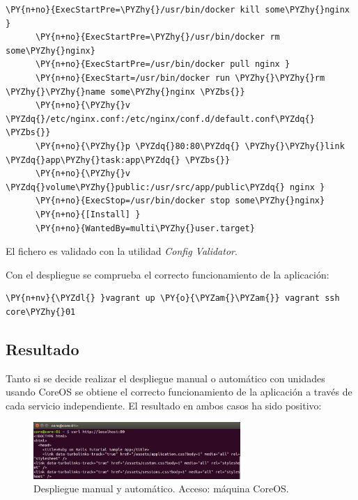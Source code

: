\begin{codelisting}
\begin{Verbatim}[fontsize=\relsize{-2.5},fontseries=b,commandchars=\\\{\}]
      \PY{n+no}{ExecStartPre=\PYZhy{}/usr/bin/docker kill some\PYZhy{}nginx }
      \PY{n+no}{ExecStartPre=\PYZhy{}/usr/bin/docker rm some\PYZhy{}nginx}
      \PY{n+no}{ExecStartPre=/usr/bin/docker pull nginx }
      \PY{n+no}{ExecStart=/usr/bin/docker run \PYZhy{}\PYZhy{}rm \PYZhy{}\PYZhy{}name some\PYZhy{}nginx \PYZbs{}}
      \PY{n+no}{\PYZhy{}v \PYZdq{}/etc/nginx.conf:/etc/nginx/conf.d/default.conf\PYZdq{} \PYZbs{}}
      \PY{n+no}{\PYZhy{}p \PYZdq{}80:80\PYZdq{} \PYZhy{}\PYZhy{}link \PYZdq{}app\PYZhy{}task:app\PYZdq{} \PYZbs{}}
      \PY{n+no}{\PYZhy{}v \PYZdq{}volume\PYZhy{}public:/usr/src/app/public\PYZdq{} nginx }
      \PY{n+no}{ExecStop=/usr/bin/docker stop some\PYZhy{}nginx}
      \PY{n+no}{[Install] }
      \PY{n+no}{WantedBy=multi\PYZhy{}user.target}
\end{Verbatim}
\end{codelisting}

El fichero es validado con la utilidad \textit{Config Validator}. 

Con el despliegue se comprueba el correcto funcionamiento de la aplicación:

\begin{framed_shaded}
\begin{Verbatim}[fontsize=\relsize{-2.5},fontseries=b,commandchars=\\\{\}]
\PY{n+nv}{\PYZdl{} }vagrant up \PY{o}{\PYZam{}\PYZam{}} vagrant ssh core\PYZhy{}01
\end{Verbatim}
\end{framed_shaded}

\subsection{Resultado}
Tanto si se decide realizar el despliegue manual o automático con unidades usando CoreOS se obtiene el correcto funcionamiento de la aplicación a través de cada servicio independiente.
El resultado en ambos casos ha sido positivo:

\begin{figure}[H]
\centering
\includegraphics[width=0.7\textwidth]{images/figures/coreosmanualcurl.png}
\caption{Despliegue manual y automático. Acceso: máquina CoreOS.}
\end{figure}

